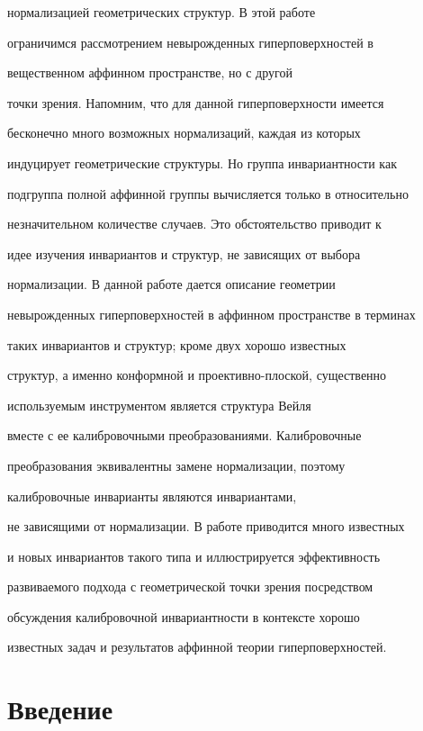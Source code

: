 нормализацией геометрических структур. В этой работе 


ограничимся рассмотрением невырожденных гиперповерхностей в


вещественном аффинном пространстве, но с другой


точки зрения. Напомним, что для данной гиперповерхности имеется


бесконечно много возможных нормализаций, каждая из которых


индуцирует геометрические структуры. Но группа инвариантности как


подгруппа полной аффинной группы вычисляется только в относительно


незначительном количестве случаев. Это обстоятельство приводит к


идее изучения инвариантов и структур, не зависящих от выбора


нормализации. В данной работе дается описание геометрии


невырожденных гиперповерхностей в аффинном пространстве в терминах


таких инвариантов и структур; кроме двух хорошо известных


структур, а именно конформной и проективно-плоской, существенно


используемым инструментом является структура Вейля


вместе с ее калибровочными преобразованиями. Калибровочные


преобразования эквивалентны замене нормализации, поэтому


калибровочные инварианты являются инвариантами,


не зависящими от нормализации. В работе приводится много известных


и новых инвариантов такого типа и иллюстрируется эффективность


развиваемого подхода с геометрической точки зрения посредством


обсуждения калибровочной инвариантности в контексте хорошо


известных задач и результатов аффинной теории гиперповерхностей.








\section{Введение}





